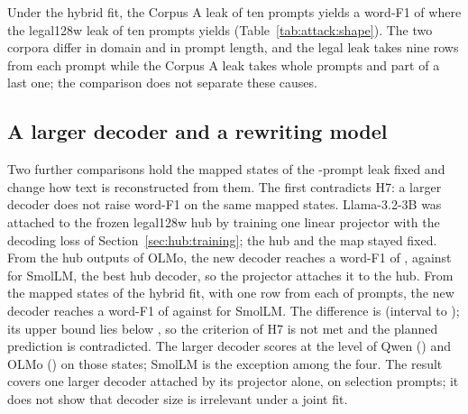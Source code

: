 Under the hybrid fit, the Corpus A leak of ten prompts yields a word-F1 of  where the legal128w leak of ten prompts yields  (Table~\ref{tab:attack:shape}).
The two corpora differ in domain and in prompt length, and the legal leak takes nine rows from each prompt while the Corpus A leak takes whole prompts and part of a last one; the comparison does not separate these causes.

\subsection{A larger decoder and a rewriting model}\label{sec:attack:leak:decoder}

Two further comparisons hold the mapped states of the -prompt leak fixed and change how text is reconstructed from them.
The first contradicts H7: a larger decoder does not raise word-F1 on the same mapped states.
Llama-3.2-3B was attached to the frozen legal128w hub by training one linear projector with the decoding loss of Section~\ref{sec:hub:training}; the hub and the map stayed fixed. %
From the hub outputs of OLMo, the new decoder reaches a word-F1 of , against  for SmolLM, the best hub decoder, so the projector attaches it to the hub. %
From the mapped states of the hybrid fit, with one row from each of  prompts, the new decoder reaches a word-F1 of  against  for SmolLM.
The difference is  (interval  to ); its upper bound lies below , so the criterion of H7 is not met and the planned prediction is contradicted. %
The larger decoder scores at the level of Qwen () and OLMo () on those states; SmolLM is the exception among the four. %
The result covers one larger decoder attached by its projector alone, on  selection prompts; it does not show that decoder size is irrelevant under a joint fit.

